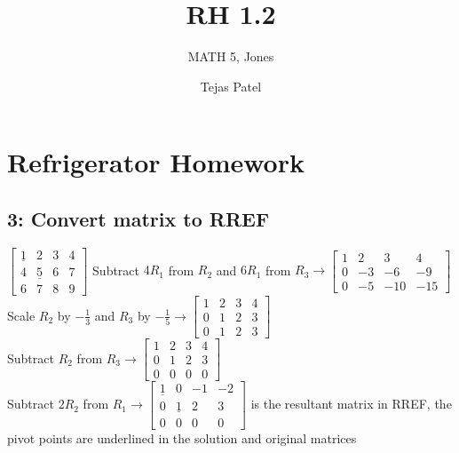 \documentclass{article}
\title{RH 1.2}
\author{MATH 5, Jones}
\date{Tejas Patel}
\begin{document}
\maketitle
\section{Refrigerator Homework}
\subsection*{3: Convert matrix to RREF}
$
\left[\begin{array}{ccc|c}
    \underline{1} & 2 & 3 & 4 \\
    4 & \underline{5} & 6 & 7 \\
    6 & 7 & 8 & 9 
\end{array}\right]
$ Subtract $4R_1$ from $R_2$ and $6R_1$ from $R_3 \rightarrow
\left[\begin{array}{ccc|c}
    1 & 2 & 3 & 4 \\
    0 & -3 & -6 & -9 \\
    0 & -5 & -10 & -15 
\end{array}\right]
$\\[0.1in]Scale $R_2$ by $-\frac{1}{3}$ and $R_3$ by $-\frac{1}{5} \rightarrow 
\left[\begin{array}{ccc|c}
    1 & 2 & 3 & 4 \\
    0 & 1 & 2 & 3 \\
    0 & 1 & 2 & 3 
\end{array}\right]$ \\[0.1in] Subtract $R_2$ from $R_3 \rightarrow
\left[\begin{array}{ccc|c}
    1 & 2 & 3 & 4 \\
    0 & 1 & 2 & 3 \\
    0 & 0 & 0 & 0 
\end{array}\right]$ \\[0.1in] Subtract $2R_2$ from $R_1 \rightarrow
\boxed{\left[\begin{array}{ccc|c}
    \underline{1} & 0 & -1 & -2 \\
    0 & \underline{1} & 2 & 3 \\
    0 & 0 & 0 & 0 
\end{array}\right]}
$ is the resultant matrix in RREF, the pivot points are underlined in the solution and original matrices
\end{document}
